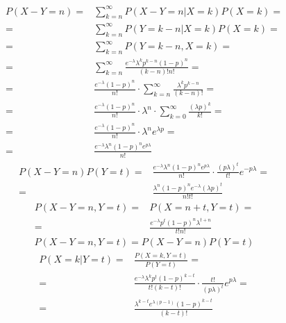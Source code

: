 \begin{align*}
P\left(X-Y=n\right)=&
\sum_{k=n}^{\infty }P\left(X-Y=n|X=k\right)P\left(X=k\right)
=\\=&
\sum_{k=n}^{\infty }P\left(Y=k-n|X=k\right)P\left(X=k\right)
=\\=&
\sum_{k=n}^{\infty }P\left(Y=k-n,X=k\right)
=\\=&
\sum_{k=n}^{\infty }\frac{e^{-\lambda } \lambda ^k p^{k-n} (1-p)^{n}}{(k-n)! n!}
=\\=&
\frac{e^{-\lambda } (1-p)^{n}}{n!}\cdot
\sum_{k=n}^{\infty }\frac{\lambda ^k p^{k-n} }{(k-n)! }
=\\=&
\frac{e^{-\lambda } (1-p)^{n}}{n!}\cdot \lambda^n\cdot
\sum_{k=0}^{\infty }\frac{(\lambda p)^{k} }{k!}
=\\=&
\frac{e^{-\lambda } (1-p)^{n}}{n!}\cdot \lambda^n
e^{\lambda p}
=\\=&
\frac{e^{-\lambda } \lambda ^n (1-p)^n e^{p\lambda}}{n!}
\end{align*}
\begin{align*}
P\left(X-Y=n\right)P\left(Y=t\right)=&
\frac{e^{-\lambda } \lambda ^n (1-p)^n e^{p\lambda}}{n!}
\cdot \frac{ (p\lambda)^t}{t!}e^{-p\lambda}
=\\=&
\frac{\lambda ^n (1-p)^n e^{-\lambda} (\lambda  p)^t}{n! t!}
\end{align*}
\begin{align*}
P\left(X-Y=n,Y=t\right)=&
P\left(X=n+t,Y=t\right)
=\\=&
\frac{e^{-\lambda } p^t (1-p)^n \lambda ^{t+n}}{t! n!}
\end{align*}
\begin{gather*}
P\left(X-Y=n,Y=t\right)=P\left(X-Y=n\right)P\left(Y=t\right)
\end{gather*}
\begin{align*}
P\left(X=k|Y=t\right)=&
\frac{P\left(X=k,Y=t\right)}{P\left(Y=t\right)}
=\\=&
\frac{e^{-\lambda } \lambda ^k p^t (1-p)^{k-t}}{t! (k-t)!}
\cdot \frac{t!}{ (p\lambda)^t}e^{p\lambda}
=\\=&
\frac{\lambda ^{k-t} e^{\lambda  (p-1)} (1-p)^{k-t} }{(k-t)!}
\end{align*}


